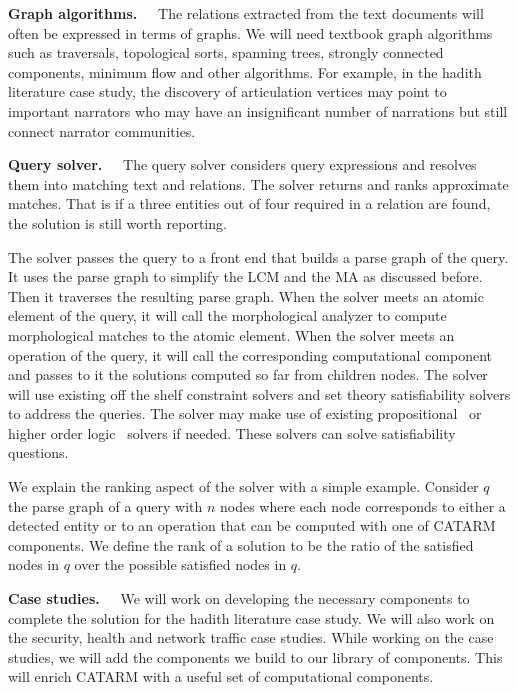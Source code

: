 \documentclass[12pt]{article}
\begin{document}
{\bf Graph algorithms.~~}
The relations extracted from the text documents will often 
be expressed in terms of graphs.
We will need textbook graph algorithms such as traversals, 
topological sorts, spanning trees, strongly connected 
components, minimum flow  and other algorithms.
For example, in the hadith literature case study, the discovery
of articulation vertices may point to important narrators 
who may have an insignificant number of narrations 
but still connect narrator communities.

{\bf Query solver.~~}
The query solver considers query expressions and resolves them 
into matching text and relations. 
The solver returns and ranks approximate matches.
That is if a three entities out of four required in a relation are
found, the solution is still worth reporting. 

The solver passes the query to a front end that builds
a parse graph of the query. 
It uses the parse graph to simplify the LCM and the MA
as discussed before. 
Then it traverses the resulting parse graph. 
When the solver meets an atomic element of the query, 
it will call the morphological analyzer to compute 
morphological matches to the atomic element.
When the solver meets an operation of the query, 
it will call the corresponding computational component 
and passes to it the solutions computed so far from children
nodes. 
The solver will use existing off the shelf constraint solvers 
and set theory satisfiability solvers to address the queries. 
The solver may make use of existing 
propositional~\cite{MiniSAT04} or
higher order logic~\cite{Z308} solvers if needed. 
These solvers can solve satisfiability questions.

We explain the ranking aspect of the solver with a simple
example. 
Consider $q$ the parse graph of a query with $n$ nodes where 
each node corresponds to either a detected entity or
to an operation that can be computed with one of CATARM components. 
We define the rank of a solution to be the ratio of  the 
satisfied nodes in $q$ over the possible satisfied
nodes in $q$. 


{\bf Case studies.~~}
We will work on developing the necessary components to complete 
the solution for the hadith literature  case study. 
We will also work on the security, health and network traffic case studies.
While working on the case studies, we will add the components
we build to our library of components. 
This will enrich CATARM with a useful set of computational 
components. 
\end{document}
